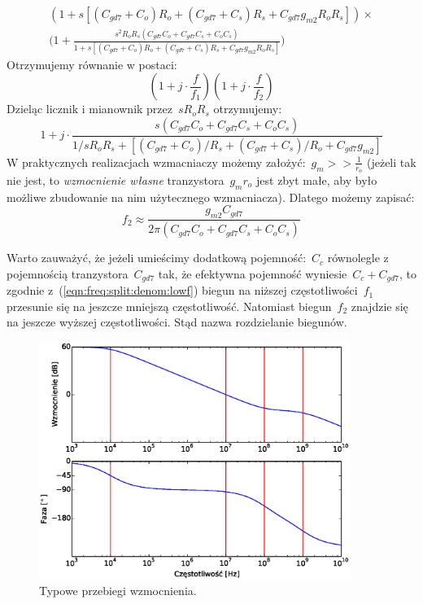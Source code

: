 \documentclass[twoside,pl,final]{labman}
\begin{document}
\begin{align}
  (1 + s[(C_{gd7} + C_o) R_o +
         (C_{gd7} + C_s) R_s +
          C_{gd7} g_{m2} R_o R_s]) \times \nonumber \\
  \Big(1 + \frac{s^2 R_o R_s (C_{gd7} C_o + C_{gd7} C_s + C_o C_s)}
                {1 + s[(C_{gd7} + C_o) R_o +
                       (C_{gd7} + C_s) R_s +
                        C_{gd7} g_{m2} R_o R_s]}\Big)
\end{align}
Otrzymujemy równanie w postaci:
\begin{equation}
  (1 + j \cdot \frac{f}{f_1})(1 + j \cdot \frac{f}{f_2})
\end{equation}
Dzieląc licznik i mianownik przez~$s R_o R_s$ otrzymujemy:
\begin{equation}
  1 + j \cdot \frac{s(C_{gd7} C_o + C_{gd7} C_s + C_o C_s)}
    {1 / s R_o R_s + [(C_{gd7} + C_o) / R_s +
                      (C_{gd7} + C_s) / R_o + C_{gd7} g_{m2}]}
\end{equation}
W praktycznych realizacjach wzmacniaczy możemy założyć:~$g_m >> \frac{1}{r_o}$
(jeżeli tak nie jest, to \emph{wzmocnienie własne}
tranzystora~$g_m r_o$ jest zbyt małe,
aby było możliwe zbudowanie na nim użytecznego wzmacniacza).
Dlatego możemy zapisać:
\begin{equation}
  f_2 \approx \frac{g_{m2} C_{gd7}}{2 \pi (C_{gd7} C_o + C_{gd7} C_s + C_o C_s)}
  \label{eqn:freq:split:denom:highf}
\end{equation}

Warto zauważyć, że jeżeli umieścimy dodatkową pojemność:~$C_c$
równolegle z pojemnością tranzystora~$C_{gd7}$ tak,
że efektywna pojemność wyniesie~$C_c + C_{gd7}$, to
zgodnie z~(\ref{eqn:freq:split:denom:lowf})
biegun na niższej częstotliwości~$f_1$
przesunie się na jeszcze mniejszą częstotliwość.
Natomiast biegun~$f_2$ znajdzie się na jeszcze wyższej częstotliwości.
Stąd nazwa rozdzielanie biegunów.

\begin{figure}[!htbp]
  \centering
  \includegraphics[width=0.9\textwidth]{tf}
  \caption{Typowe przebiegi wzmocnienia.}
  \label{fig:freq:split:tf}
\end{figure}
\end{document}
